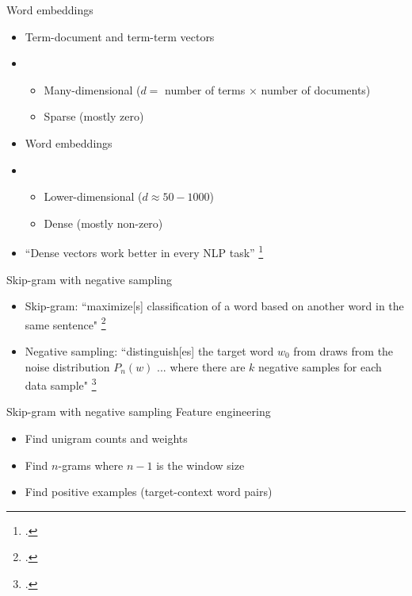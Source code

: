 \documentclass[10pt]{beamer}
\begin{document}
\begin{frame}{Word embeddings}
  \begin{itemize}
    \item Term-document and term-term vectors
    \item[]
          \begin{itemize}
            \item Many-dimensional ($d = $ number of terms $\times$ number of
                  documents)
            \item Sparse (mostly zero)
          \end{itemize}
    \item Word embeddings
    \item[]
          \begin{itemize}
            \item Lower-dimensional ($d \approx 50-1000$)
            \item Dense (mostly non-zero)
          \end{itemize}
    \item ``Dense vectors work better in every NLP task''
          \footcite[119]{Jurafsky2023}
  \end{itemize}
\end{frame}

\begin{frame}{Skip-gram with negative sampling}
  \begin{itemize}
    \item Skip-gram: ``maximize[s] classification of a word based on another
          word in the same sentence" \footcite[4]{Mikolov2013}
    \item Negative sampling: ``distinguish[es] the target word $w_0$ from draws
          from the noise distribution $P_n(w)$ ... where there are $k$ negative
          samples for each data sample" \footcite[4]{Mikolov2013a}
  \end{itemize}
\end{frame}

\begin{frame}{Skip-gram with negative sampling}
  {Feature engineering}
  \begin{itemize}
    \item Find unigram counts and weights
    \item Find $n$-grams where $n - 1$ is the window size
    \item Find positive examples (target-context word pairs)
  \end{itemize}
\end{frame}
\end{document}

